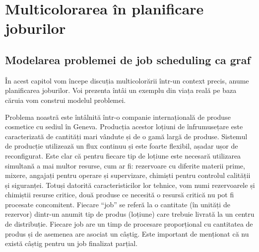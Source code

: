
\chapter{Multicolorarea în planificare joburilor}

\section{Modelarea problemei de job scheduling ca graf}
 
    În acest capitol vom începe discuția multicolorării într-un context precis, anume planificarea joburilor. Voi prezenta întâi un exemplu din viața reală pe baza căruia vom construi modelul problemei. 
    
    Problema noastră este întâlnită într-o companie internațională de produse cosmetice cu sediul în Geneva. Producția acestor loțiuni de înfrumusețare este caracterizată de cantități mari vândute și de o gamă largă de produse. Sistemul de producție utilizează un flux continuu și este foarte flexibil, așadar ușor de reconfigurat. Este clar că pentru fiecare tip de loțiune este necesară utilizarea simultană a mai multor resurse, cum ar fi: rezervoare cu diferite materii prime, mixere, angajați pentru operare și supervizare, chimiști pentru controlul calității și siguranței. Totuși datorită caracteristicilor lor tehnice, vom numi rezervoarele și chimiștii resurse critice, două produse ce necesită o resursă critică nu pot fi procesate concomitent. Fiecare ``job'' se referă la o cantitate (în unități de rezervor) dintr-un anumit tip de produs (loțiune) care trebuie livrată la un centru de distribuție. Fiecare job are un timp de procesare proporțional cu cantitatea de produs și de asemenea are asociat un câștig. Este important de menționat că nu există câștig pentru un job finalizat parțial.\cite{thevenin2016graph}

  



